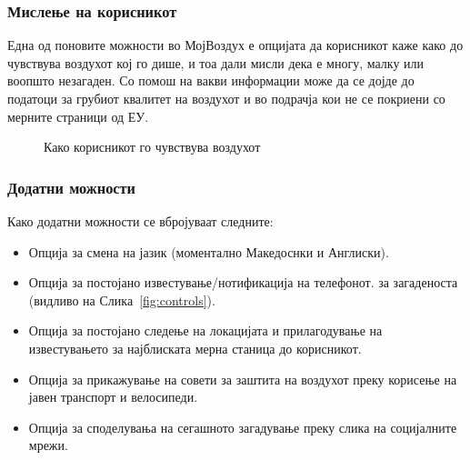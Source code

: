 \documentclass{uvamscse}
\begin{document}
\subsubsection{Мислење на корисникот}

Една од поновите можности во МојВоздух е опцијата да корисникот каже како до чувствува воздухот кој го дише, и тоа дали мисли дека е многу, малку или воопшто незагаден. Со помош на вакви информации може да се дојде до податоци за грубиот квалитет на воздухот и во подрачја кои не се покриени со мерните страници од ЕУ.

\begin{figure}[H]
\centering
  \caption{Како корисникот го чувствува воздухот}
  \label{fig:feelslike}
\end{figure}

\subsubsection{Додатни можности}
Како додатни можности се вбројуваат следните:
\begin{itemize}
\item Опција за смена на јазик (моментално Македоснки и Англиски).
\item Опција за постојано известување/нотификација на телефонот. за загаденоста (видливо на Слика~\ref{fig:controls}).
\item Опција за постојано следење на локацијата и прилагодување на известувањето за најблиската мерна станица до корисникот.
\item Опција за прикажување на совети за заштита на воздухот преку корисење на јавен транспорт и велосипеди.
\item Опција за споделувања на сегашното загадување преку слика на социјалните мрежи.
\end{itemize}
\end{document}
